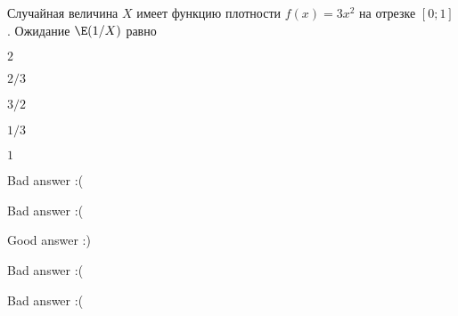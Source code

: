 
\begin{question}
Случайная величина \(X\) имеет функцию плотности \(f(x) = 3x^2\) на
отрезке \([0;1]\). Ожидание \(\E(1/X)\) равно
\begin{answerlist}
  \item \(2\)
  \item \(2/3\)
  \item \(3/2\)
  \item \(1/3\)
  \item \(1\)
\end{answerlist}
\end{question}

\begin{solution}
\begin{answerlist}
  \item Bad answer :(
  \item Bad answer :(
  \item Good answer :)
  \item Bad answer :(
  \item Bad answer :(
\end{answerlist}
\end{solution}

